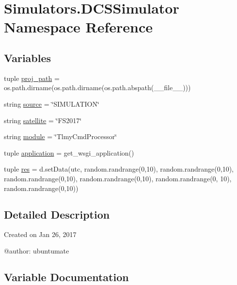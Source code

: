 \hypertarget{namespace_simulators_1_1_d_c_s_simulator}{}\section{Simulators.\+D\+C\+S\+Simulator Namespace Reference}
\label{namespace_simulators_1_1_d_c_s_simulator}
\subsection*{Variables}
\begin{DoxyCompactItemize}
\item 
tuple \hyperlink{namespace_simulators_1_1_d_c_s_simulator_a0e84958286112773d2ba1bebd1609392}{proj\+\_\+path} = os.\+path.\+dirname(os.\+path.\+dirname(os.\+path.\+abspath(\+\_\+\+\_\+file\+\_\+\+\_\+)))
\item 
string \hyperlink{namespace_simulators_1_1_d_c_s_simulator_a12e10df9b349db60ce82354e3132066f}{source} = \char`\"{}S\+I\+M\+U\+L\+A\+T\+I\+O\+N\char`\"{}
\item 
string \hyperlink{namespace_simulators_1_1_d_c_s_simulator_ada42061815ff9cd364d8d014292b500f}{satellite} = \char`\"{}F\+S2017\char`\"{}
\item 
string \hyperlink{namespace_simulators_1_1_d_c_s_simulator_ab53903f45ca090c65dea3afd551b94f0}{module} = \char`\"{}Tlmy\+Cmd\+Processor\char`\"{}
\item 
tuple \hyperlink{namespace_simulators_1_1_d_c_s_simulator_af99eec651a96ed08a62cecb682291c05}{application} = get\+\_\+wsgi\+\_\+application()
\item 
tuple \hyperlink{namespace_simulators_1_1_d_c_s_simulator_a3f7ba89b671bdb9a730f97a7e7268639}{res} = d.\+set\+Data(utc, random.\+randrange(0,10), random.\+randrange(0,10), random.\+randrange(0,10), random.\+randrange(0,10), random.\+randrange(0, 10), random.\+randrange(0,10))
\end{DoxyCompactItemize}


\subsection{Detailed Description}
\begin{DoxyVerb}Created on Jan 26, 2017

@author: ubuntumate
\end{DoxyVerb}
 

\subsection{Variable Documentation}
\hypertarget{namespace_simulators_1_1_d_c_s_simulator_af99eec651a96ed08a62cecb682291c05}{}
